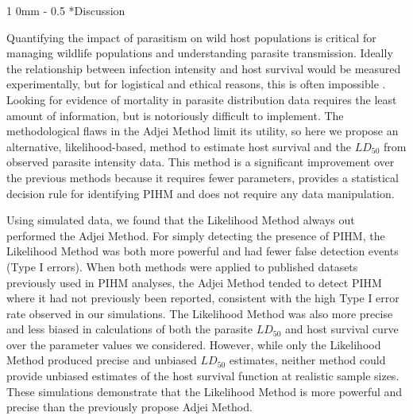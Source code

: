 \documentclass[12pt, a4paper]{article}
\makeatletter
\renewcommand{\section}{\@startsection
{section}%
{1}%
{0mm}%
{-\baselineskip}%
{0.5\baselineskip}%
{\normalfont\bf\large}} %
\makeatother
\begin{document}
\section*{Discussion}


Quantifying the impact of parasitism on wild host populations is critical for managing wildlife populations and understanding parasite transmission. Ideally the relationship between
infection intensity and host survival would be measured experimentally, but for
logistical and ethical reasons, this is often impossible \citep{McCallum2000a}.
Looking for evidence of mortality in parasite distribution data requires the
least amount of information, but is notoriously difficult to implement. The
methodological flaws in the Adjei Method limit its utility, so here we propose
an alternative, likelihood-based, method to estimate host survival and the
$LD_{50}$ from observed parasite intensity data.  This
method is a significant improvement over the previous methods because it requires fewer parameters,
provides a statistical decision rule for identifying PIHM and does not require
any data manipulation.

Using simulated data, we found that the Likelihood Method always out performed the Adjei Method. For simply detecting the presence of PIHM, the Likelihood
Method was both more powerful and had fewer false detection events (Type I
errors).  When both methods were applied to published datasets previously used
in PIHM analyses, the Adjei Method tended to detect PIHM where it had not previously been
reported, consistent with the high Type I error rate observed in our
simulations. The Likelihood Method was also more precise and less
biased in calculations of both the parasite $LD_{50}$ and host survival curve over the parameter values we considered.
However, while only the Likelihood Method produced precise and unbiased $LD_{50}$
estimates, neither method could provide unbiased estimates of the host survival
function at realistic sample sizes.  These simulations demonstrate that
the Likelihood Method is more powerful and precise than the previously propose Adjei Method.
\end{document}
